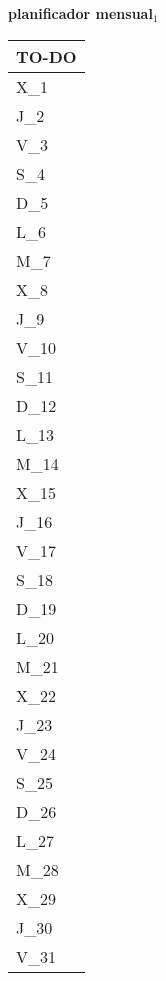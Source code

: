 \clearpage
{\raggedright
	\fontsize{25}{50}\selectfont
	\textbf{\NextYear}
}\scriptsize{\textbf{planificador mensual$_1$}}\\[11.3pt]



	\noindent\dotfill
	\renewcommand{\arraystretch}{1.5}\scriptsize
		\begin{longtabu} to \textwidth { X[l]}
		\centering \small{\textbf{TO-DO}} \\
		\toprule
		X_{1} \dotfill\\
		J_{2} \dotfill\\
		V_{3} \dotfill\\
		S_{4} \dotfill\\
		D_{5} \dotfill\\
		\hline
		L_{6} \dotfill\\
		M_{7} \dotfill\\
		X_{8} \dotfill\\
		J_{9} \dotfill\\
		V_{10} \dotfill\\
		S_{11} \dotfill\\
		D_{12} \dotfill\\
		\hline
		L_{13} \dotfill\\
		M_{14} \dotfill\\
		X_{15} \dotfill\\
		J_{16} \dotfill\\
		V_{17} \dotfill\\
		S_{18} \dotfill\\
		D_{19} \dotfill\\
		\hline
		L_{20} \dotfill\\
		M_{21} \dotfill\\
		X_{22} \dotfill\\
		J_{23} \dotfill\\
		V_{24} \dotfill\\
		S_{25} \dotfill\\
		D_{26} \dotfill\\
		\hline
		L_{27} \dotfill\\
		M_{28} \dotfill\\
		X_{29} \dotfill\\
		J_{30} \dotfill\\
		V_{31} \dotfill\\

		\bottomrule

	\end{longtabu}


\clearpage
